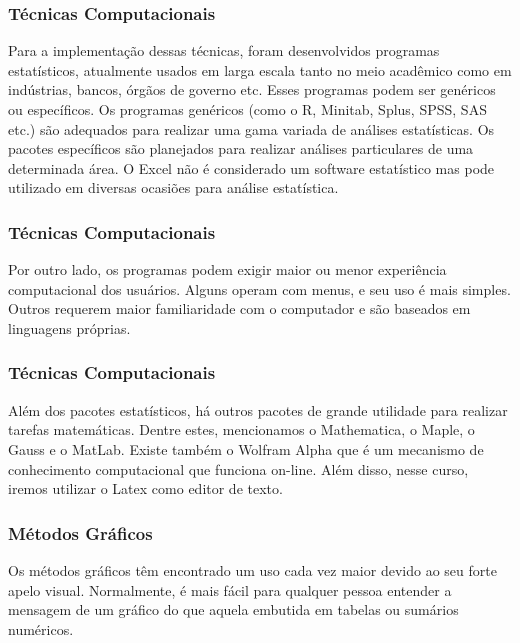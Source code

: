 \documentclass[14pt,aspectratio=1610]{beamer}
\begin{document}
\begin{frame}{}
\frametitle{Técnicas Computacionais}
\begin{block}{}
\justifying
Para a implementação dessas técnicas, foram desenvolvidos programas estatísticos, atualmente usados em larga escala tanto no meio acadêmico como em indústrias, bancos, órgãos de governo etc. Esses programas podem ser genéricos ou específicos. Os programas genéricos (como o R, Minitab, Splus, SPSS, SAS etc.) são adequados para realizar uma gama variada de análises estatísticas. Os pacotes específicos são planejados para realizar análises particulares de uma determinada área. O Excel não é considerado um software estatístico mas pode utilizado em diversas ocasiões para análise estatística.
\end{block}
\end{frame}

\begin{frame}{}
\frametitle{Técnicas Computacionais}
\begin{block}{}
\justifying
Por outro lado, os programas podem exigir maior ou menor experiência computacional
dos usuários. Alguns operam com menus, e seu uso é mais simples. Outros requerem
maior familiaridade com o computador e são baseados em linguagens próprias.
\end{block}
\end{frame}

\begin{frame}{}
\frametitle{Técnicas Computacionais}
\begin{block}{}
\justifying
Além dos pacotes estatísticos, há outros pacotes de grande utilidade para realizar tarefas matemáticas. Dentre estes, mencionamos o Mathematica, o Maple, o Gauss e o 
MatLab. Existe também o Wolfram Alpha que é um mecanismo de conhecimento computacional que funciona on-line. Além disso, nesse curso, iremos utilizar o Latex como editor de texto.
\end{block}
\end{frame}

\begin{frame}{}
\frametitle{Métodos Gráficos}
\begin{block}{}
\justifying
Os métodos gráficos têm encontrado um uso cada vez maior devido ao seu forte apelo visual. Normalmente, é mais fácil para qualquer pessoa entender a mensagem de um gráfico do que aquela embutida em tabelas ou sumários numéricos.
\end{block}
\end{frame}
\end{document}
